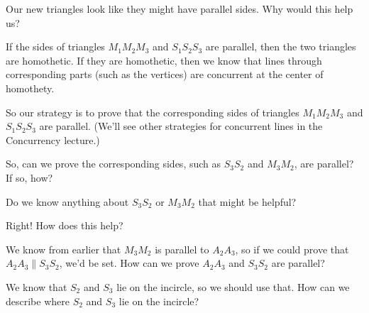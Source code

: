 Our new triangles look like they might have parallel sides. Why would this help us?



If the sides of triangles $M_1M_2M_3$ and $S_1S_2S_3$ are parallel, then the two triangles are homothetic. If they are homothetic, then we know that lines through corresponding parts (such as the vertices) are concurrent at the center of homothety.

So our strategy is to prove that the corresponding sides of triangles $M_1 M_2 M_3$ and $S_1 S_2 S_3$ are parallel. (We'll see other strategies for concurrent lines in the Concurrency lecture.)

So, can we prove the corresponding sides, such as $S_3S_2$ and $M_3M_2$, are parallel?  If so, how?

Do we know anything about $S_3S_2$ or $M_3M_2$ that might be helpful?


Right! How does this help?



We know from earlier that $M_3M_2$ is parallel to $A_2A_3$, so if we could prove that $A_2A_3 \parallel S_3S_2$, we'd be set. How can we prove $A_2A_3$ and $S_3S_2$ are parallel?

We know that $S_2$ and $S_3$ lie on the incircle, so we should use that. How can we describe where $S_2$ and $S_3$ lie on the incircle?



